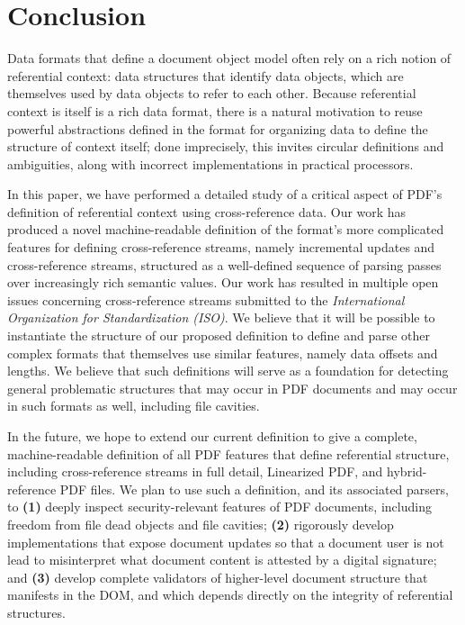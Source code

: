 \section{Conclusion}
\label{sec:conclusion}
Data formats that define a document object model often rely on a rich
notion of referential context: data structures that identify data
objects, which are themselves used by data objects to refer to each
other.
%
Because referential context is itself is a rich data format, there is
a natural motivation to reuse powerful abstractions defined in the
format for organizing data to define the structure of context itself;
%
done imprecisely, this invites circular definitions and ambiguities,
along with incorrect implementations in practical processors.

In this paper, we have performed a detailed study of a critical aspect
of PDF's definition of referential context using cross-reference data.
%
Our work has produced a novel machine-readable definition of the
format's more complicated features for defining cross-reference
streams, namely incremental updates and cross-reference streams,
structured as a well-defined sequence of parsing passes over
increasingly rich semantic values.
%
Our work has resulted in multiple open issues concerning
cross-reference streams submitted to the \emph{International
  Organization for Standardization (ISO)}.
%
We believe that it will be possible to instantiate the structure of
our proposed definition to define and parse other complex formats
that themselves use similar features, namely data offsets and lengths.
%
We believe that such definitions will serve as a foundation for
detecting general problematic structures that may occur in PDF
documents and may occur in such formats as well, including file
cavities.

In the future, we hope to extend our current definition to give a
complete, machine-readable definition of all PDF features that define
referential structure, including cross-reference streams in full
detail, Linearized PDF, and hybrid-reference PDF files.
%
We plan to use such a definition, and its associated parsers, to
% 
\textbf{(1)} deeply inspect security-relevant features of PDF
documents, including freedom from file dead objects and file cavities;
%
\textbf{(2)} rigorously develop implementations that expose document
updates so that a document user is not lead to misinterpret what
document content is attested by a digital signature; and
% 
\textbf{(3)} develop complete validators of higher-level document
structure that manifests in the DOM, and which depends directly on the
integrity of referential structures.
